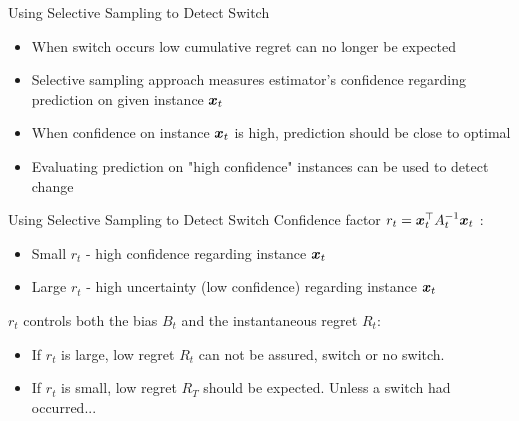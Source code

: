 \documentclass{beamer}
\begin{document}
\begin{frame}{Using Selective Sampling to Detect Switch}
\begin{itemize}
\item When switch occurs low cumulative regret can no longer be expected \newline
\item Selective sampling approach measures estimator's confidence regarding prediction on given instance ${\boldsymbol{x}}_{t}$ \newline
\item When confidence on instance ${\boldsymbol{x}}_{t}$ is high, prediction should be close to optimal \newline
\item Evaluating prediction on "high confidence" instances can be used to detect change \newline
\end{itemize}


\end{frame}

\begin{frame}{Using Selective Sampling to Detect Switch}
Confidence factor $r_t={{\boldsymbol{x}}}^{\top}_{t}A_{t}^{-1}{\boldsymbol{x}}_{t}$ :\newline
\begin{itemize}
\item Small  $r_t$ - high confidence regarding instance ${\boldsymbol{x}}_{t}$
\item Large  $r_t$ - high uncertainty (low confidence) regarding instance ${\boldsymbol{x}}_{t}$
\newline
\end{itemize}
 $r_t$ controls both the bias $B_t$  and the instantaneous regret $R_t$:\newline
\begin{itemize}
\item If $r_t$ is large, low regret $R_t$ can not be assured, switch or no switch.
\item If $r_t$ is small, low regret $R_T$ should be expected. Unless a switch had occurred...
\end{itemize}

\end{frame}
\end{document}
